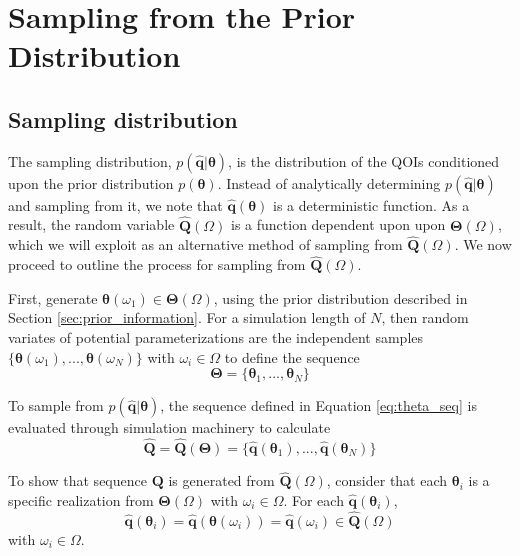 \section{Sampling from the Prior Distribution}
\label{sec:sampling}

\subsection{Sampling distribution}

The sampling distribution, $p(\hat{\bm{q}}|\bm{\theta})$, is the distribution of the QOIs conditioned upon the prior distribution $p(\bm{\theta})$.  Instead of analytically determining $p(\hat{\bm{q}}|\bm{\theta})$ and sampling from it, we note that $\hat{\bm{q}}(\bm{\theta})$ is a deterministic function.  As a result, the random variable $\hat{\bm{Q}}(\Omega)$ is a function dependent upon upon $\bm{\Theta}(\Omega)$, which we will exploit as an alternative method of sampling from $\hat{\bm{Q}}(\Omega)$.  We now proceed to outline the process for sampling from $\hat{\bm{Q}}(\Omega)$.

First, generate $\bm{\theta}(\omega_1) \in \bm{\Theta}(\Omega)$, using the prior distribution described in Section \ref{sec:prior_information}.  For a simulation length of $N$, then random variates of potential parameterizations are the independent samples $\{\bm{\theta}(\omega_1),...,\bm{\theta}(\omega_N)\}$ with $\omega_i \in \Omega$ to define the sequence
\begin{equation}
\label{eq:theta_seq}
	  \bm{\Theta} = \{\bm{\theta}_1,...,\bm{\theta}_N\}
\end{equation}

To sample from $p(\hat{\bm{q}}|\bm{\theta})$, the sequence defined in Equation \ref{eq:theta_seq} is evaluated through simulation machinery to calculate
\begin{equation}
\label{eq:qoi_seq}
	\hat{\bm{Q}}
	= \hat{\bm{Q}}(\bm{\Theta})
	= \{\hat{\bm{q}}(\bm{\theta}_1),...,\hat{\bm{q}}(\bm{\theta}_N)\}
\end{equation}

To show that sequence $\bm{Q}$ is generated from $\hat{\bm{Q}}(\Omega)$, consider that each $\bm{\theta}_i$ is a specific realization from $\bm{\Theta}(\Omega)$ with $\omega_i \in \Omega$.
For each $\hat{\bm{q}}(\bm{\theta}_i)$,
\begin{equation}
	\hat{\bm{q}}(\bm{\theta}_i) = \hat{\bm{q}}(\bm{\theta}(\omega_i)) = \hat{\bm{q}}(\omega_i) \in \hat{\bm{Q}}(\Omega)
\end{equation}
with $\omega_i \in \Omega$.

